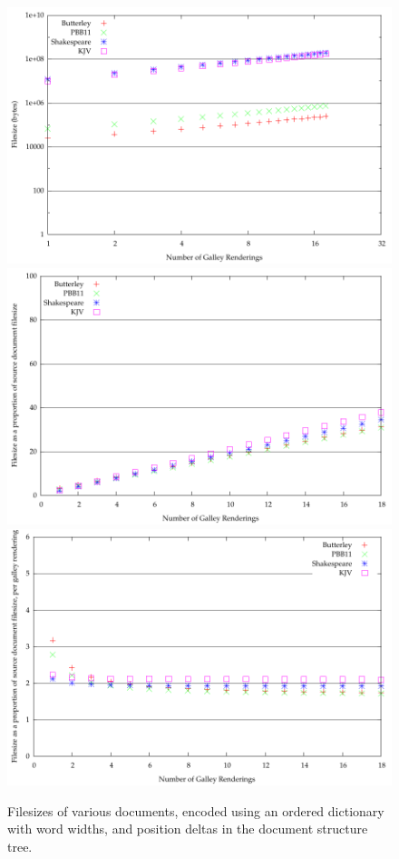 \begin{figure}
  \begin{center}
  \includegraphics[width=\textwidth]{gnuplot/5-b}
  \includegraphics[width=\textwidth]{gnuplot/5-s}
  \includegraphics[width=\textwidth]{gnuplot/5-r}
  \end{center}
  \caption[Filesizes of documents with an ordered dictionary and relative positioning]{Filesizes of various documents, encoded using an ordered dictionary with word widths, and position deltas in the document structure tree.}
  \label{fig:size-deltas}
\end{figure}

